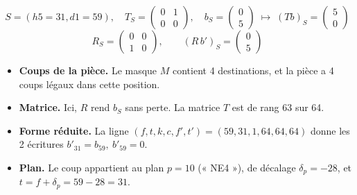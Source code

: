 \[ S = (h5=31, d1=59),\quad T_S = \begin{pmatrix}0 & 1 \\ 0 & 0\end{pmatrix},\quad b_S = \begin{pmatrix}0 \\ 5\end{pmatrix}\;\longmapsto\; (Tb)_S =\begin{pmatrix}5 \\ 0\end{pmatrix} \]
\[ R_S = \begin{pmatrix}0 & 0 \\ 1 & 0\end{pmatrix},\qquad (R\,b')_S = \begin{pmatrix}0 \\ 5\end{pmatrix} \]
\begin{itemize}
\item \textbf{Coups de la pièce.} Le masque $M$ contient 4 destinations, et la pièce a 4 coups légaux dans cette position.
\item \textbf{Matrice.} Ici, $R$ rend $b_S$ sans perte. La matrice $T$ est de rang 63 sur 64.
\item \textbf{Forme réduite.} La ligne $(f, t, k, c, f', t') = (59, 31, 1, 64, 64, 64)$ donne les 2 écritures $b'_{31} = b_{59},\ b'_{59} = 0$.
\item \textbf{Plan.} Le coup appartient au plan $p = 10$ (« NE4 »), de décalage $\delta_p = -28$, et $t = f + \delta_p = 59 -28 = 31$.
\end{itemize}
